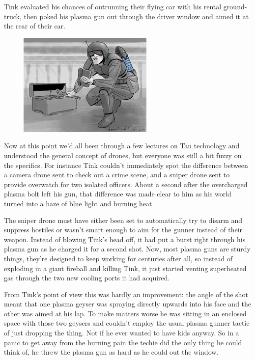 Tink evaluated his chances of outrunning their flying car with his rental ground-truck, then poked his plasma gun out through the driver window and aimed it at the rear of their car.
\begin{figure}
	\begin{center}
		\includegraphics[width=\figwidth]{pics/10/28.png}
	\end{center}
\end{figure}
Now at this point we'd all been through a few lectures on Tau technology and understood the general concept of drones, but everyone was still a bit fuzzy on the specifics. 
For instance Tink couldn't immediately spot the difference between a camera drone sent to check out a crime scene, and a sniper drone sent to provide overwatch for two isolated officers. 
About a second after the overcharged plasma bolt left his gun, that difference was made clear to him as his world turned into a haze of blue light and burning heat.

The sniper drone must have either been set to automatically try to disarm and suppress hostiles or wasn't smart enough to aim for the gunner instead of their weapon. 
Instead of blowing Tink's head off, it had put a burst right through his plasma gun as he charged it for a second shot. 
Now, most plasma guns are sturdy things, they're designed to keep working for centuries after all, so instead of exploding in a giant fireball and killing Tink, it just started venting superheated gas through the two new cooling ports it had acquired. 


From Tink's point of view this was hardly an improvement: 
the angle of the shot meant that one plasma geyser was spraying directly upwards into his face and the other was aimed at his lap. 
To make matters worse he was sitting in an enclosed space with those two geysers and couldn't employ the usual plasma gunner tactic of just dropping the thing. 
Not if he ever wanted to have kids anyway. 
So in a panic to get away from the burning pain the techie did the only thing he could think of, he threw the plasma gun as hard as he could out the window. 



